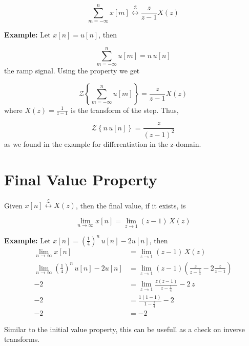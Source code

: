 \documentclass{article}
\begin{document}
\[
\sum\limits_{m = -\infty}^{n} x[m] \stackrel{\mathcal{Z}}{\longleftrightarrow} \frac{z}{z-1} X(z) 
\]

\textbf{Example:} Let $x[n] = u[n]$, then

\[
\sum\limits_{m = -\infty}^{n} u[m] = n\, u[n] 
\]
the ramp signal. Using the property we get

\[
\mathcal{Z}\left\{ \sum\limits_{m = -\infty}^{n} u[m] \right\} = \frac{z}{z-1} X(z)
\]
where $X(z) = \frac{1}{z-1}$ is the transform of the step. Thus,

\[
\mathcal{Z}\left\{ n\, u[n] \right\} = \frac{z}{(z-1)^2}
\]
as we found in the example for differentiation in the z-domain.

\section{Final Value Property}

Given $x[n] \stackrel{\mathcal{Z}}{\longleftrightarrow} X(z)$, then the final value, if it exists, is

\[
\lim_{n\rightarrow \infty} x[n] = \lim_{z\rightarrow 1} (z-1)\, X(z) 
\]

\textbf{Example:} Let $x[n] = \left(\frac{1}{4}\right)^n\, u[n] - 2u[n]$, then
\begin{align*}
  \lim_{n\rightarrow \infty} x[n] &= \lim_{z\rightarrow 1} (z-1)\, X(z)\\
  \lim_{n\rightarrow \infty} \left(\frac{1}{4}\right)^n\, u[n] - 2u[n] &= \lim_{z\rightarrow 1} (z-1)\left(\frac{z}{z-\frac{1}{4}} - 2 \frac{z}{z-1} \right)\\
  -2 &= \lim_{z\rightarrow 1} \frac{z(z-1)}{z-\frac{1}{4}} - 2\, z\\
  -2 &= \frac{1(1-1)}{1-\frac{1}{4}} - 2\\
  -2 &= -2
\end{align*}

Similar to the initial value property, this can be usefull as a check on inverse transforms.
\end{document}
